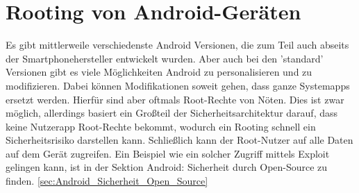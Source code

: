 \section{Rooting von Android-Geräten}

	Es gibt mittlerweile verschiedenste Android Versionen, die zum Teil auch abseits der Smartphonehersteller entwickelt wurden. Aber auch bei den 'standard' Versionen gibt es viele Möglichkeiten Android zu personalisieren und zu modifizieren. Dabei können Modifikationen soweit gehen, dass ganze Systemapps ersetzt werden. Hierfür sind aber oftmals Root-Rechte von Nöten. Dies ist zwar möglich, allerdings basiert ein Großteil der Sicherheitsarchitektur darauf, dass keine Nutzerapp Root-Rechte bekommt, wodurch ein Rooting schnell ein Sicherheitsrisiko darstellen kann. Schließlich kann der Root-Nutzer auf alle Daten auf dem Gerät zugreifen.
	Ein Beispiel wie ein solcher Zugriff mittels Exploit gelingen kann, ist in der Sektion Android: Sicherheit durch Open-Source zu finden. \ref{sec:Android_Sicherheit_Open_Source}
	